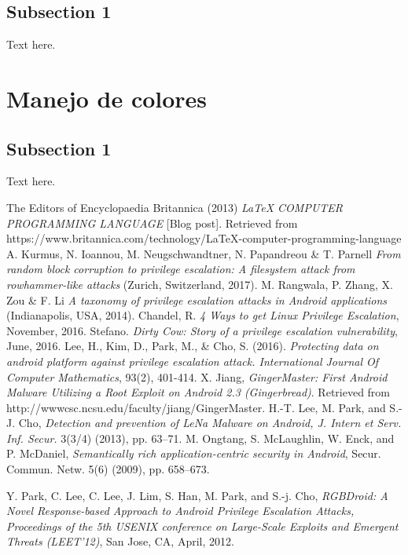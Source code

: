 \documentclass[letterpaper, 10pt, journal]{IEEEtran}
\begin{document}
\subsection{Subsection 1}
Text here.

\section{Manejo de colores}
\subsection{Subsection 1}
Text here.

\begin{thebibliography}{1}
\bibitem{[1]}The Editors of Encyclopaedia Britannica  (2013) \emph{LaTeX COMPUTER PROGRAMMING LANGUAGE} [Blog post]. Retrieved from https://www.britannica.com/technology/LaTeX-computer-programming-language
 A. Kurmus, N. Ioannou, M. Neugschwandtner, N. Papandreou \& T. Parnell \emph{From random block corruption to privilege escalation: A filesystem attack from rowhammer-like attacks} (Zurich, Switzerland, 2017).
 M. Rangwala, P. Zhang, X. Zou \& F. Li \emph{A taxonomy of privilege escalation attacks in Android applications} (Indianapolis, USA, 2014).
 Chandel, R. \emph{4 Ways to get Linux Privilege Escalation}, November, 2016.
 Stefano. \emph{Dirty Cow: Story of a privilege escalation vulnerability}, June, 2016.
Lee, H., Kim, D., Park, M., & Cho, S. (2016).  \emph{Protecting data on android platform against privilege escalation attack. International Journal Of Computer Mathematics}, 93(2), 401-414.
 X. Jiang,\emph{ GingerMaster: First Android Malware Utilizing a Root Exploit on Android 2.3 (Gingerbread)}.  Retrieved from http://wwwcsc.ncsu.edu/faculty/jiang/GingerMaster. 
 H.-T. Lee, M. Park, and S.-J. Cho,\emph{ Detection and prevention of LeNa Malware on Android, J. Intern et Serv. Inf.
Secur.} 3(3/4) (2013), pp. 63–71. 
 M. Ongtang, S. McLaughlin, W. Enck, and P. McDaniel, \emph{Semantically rich application-centric security in Android},
Secur. Commun. Netw. 5(6) (2009), pp. 658–673.

 Y. Park, C. Lee, C. Lee, J. Lim, S. Han, M. Park, and S.-j. Cho, \emph{RGBDroid: A Novel Response-based Approach
to Android Privilege Escalation Attacks, Proceedings of the 5th USENIX conference on Large-Scale Exploits and
Emergent Threats (LEET’12)}, San Jose, CA, April, 2012.


\end{thebibliography}
\end{document}
